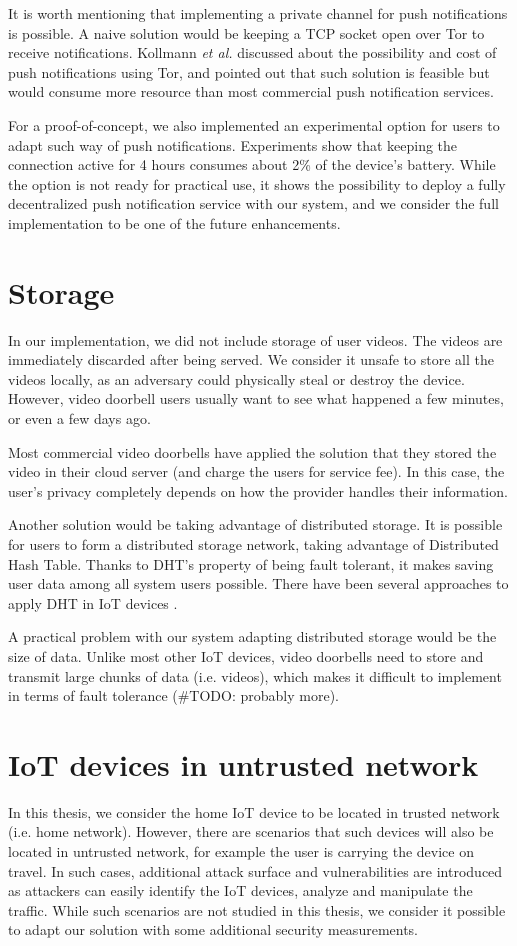 It is worth mentioning that implementing a private channel for push notifications is possible. A naive solution would be keeping a TCP socket open over Tor to receive notifications. Kollmann \textit{et al.} \cite{kollmann2017cost} discussed about the possibility and cost of push notifications using Tor, and pointed out that such solution is feasible but would consume more resource than most commercial push notification services.

For a proof-of-concept, we also implemented an experimental option for users to adapt such way of push notifications. Experiments show that keeping the connection active for 4 hours consumes about 2\% of the device's battery. While the option is not ready for practical use, it shows the possibility to deploy a fully decentralized push notification service with our system, and we consider the full implementation to be one of the future enhancements.

\section{Storage}
In our implementation, we did not include storage of user videos. The videos are immediately discarded after being served. We consider it unsafe to store all the videos locally, as an adversary could physically steal or destroy the device. However, video doorbell users usually want to see what happened a few minutes, or even a few days ago.

Most commercial video doorbells have applied the solution that they stored the video in their cloud server (and charge the users for service fee). In this case, the user's privacy completely depends on how the provider handles their information.

Another solution would be taking advantage of distributed storage. It is possible for users to form a distributed storage network, taking advantage of Distributed Hash Table. Thanks to DHT's property of being fault tolerant, it makes saving user data among all system users possible. There have been several approaches to apply DHT in IoT devices \cite{fabian2014privacy} \cite{paganelli2012dht}.

A practical problem with our system adapting distributed storage would be the size of data. Unlike most other IoT devices, video doorbells need to store and transmit large chunks of data (i.e. videos), which makes it difficult to implement in terms of fault tolerance (\#TODO: probably more).


\section{IoT devices in untrusted network}
In this thesis, we consider the home IoT device to be located in trusted network (i.e. home network). However, there are scenarios that such devices will also be located in untrusted network, for example the user is carrying the device on travel. In such cases, additional attack surface and vulnerabilities are introduced as attackers can easily identify the IoT devices, analyze and manipulate the traffic. While such scenarios are not studied in this thesis, we consider it possible to adapt our solution with some additional security measurements. 

